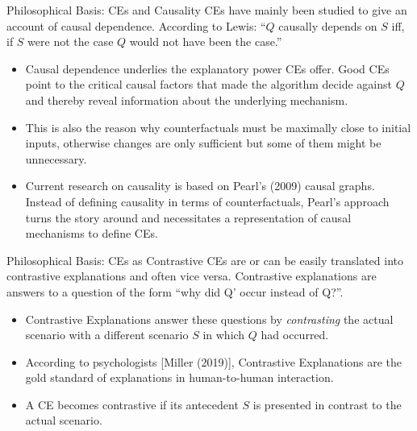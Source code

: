 \documentclass[11pt,compress,t,notes=noshow, xcolor=table]{beamer}
\begin{document}
\begin{vbframe}{Philosophical Basis: CEs and Causality}
CEs have mainly been studied to give an account of causal dependence. According to Lewis:\newline
``$Q$ causally depends on $S$ iff, if $S$ were not the case $Q$ would not have been the case.''
	\begin{itemize}
		\item Causal dependence underlies the explanatory power CEs offer. Good CEs point to the critical causal factors that made the algorithm decide against $Q$ and thereby reveal information about the underlying mechanism.
		\item This is also the reason why counterfactuals must be maximally close to initial inputs, otherwise changes are only sufficient but some of them might be unnecessary.
		\item Current research on causality is based on Pearl's (2009) causal graphs. Instead of defining causality in terms of counterfactuals, Pearl's approach turns the story around and necessitates a representation of causal mechanisms to define CEs. 
	\end{itemize}
\end{vbframe}

\begin{vbframe}{Philosophical Basis: CEs as Contrastive}
CEs are or can be easily translated into contrastive explanations and often vice versa. Contrastive explanations are answers to a question of the form ``why did Q' occur instead of Q?''.
	\begin{itemize}
	    \item  Contrastive Explanations answer these questions by \emph{contrasting} the actual scenario with a different scenario $S$ in which $Q$ had occurred.
		\item According to psychologists [Miller (2019)], Contrastive Explanations are the gold standard of explanations in human-to-human interaction.
		\item A CE becomes contrastive if its antecedent $S$ is presented in contrast to the actual scenario.
	\end{itemize}
\end{vbframe}
\end{document}
